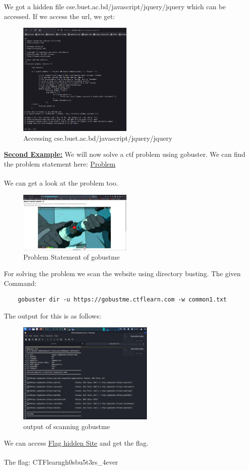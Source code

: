 \documentclass[12 pt]{article}
\begin{document}
We got a hidden file cse.buet.ac.bd/javascript/jquery/jquery which can be accessed. If we access the url, we get:
\begin{figure}[H]
    \centering
    \includegraphics[width=0.5\textwidth]{dir_4.png}
    \caption{Accessing cse.buet.ac.bd/javascript/jquery/jquery}
    \label{fig: dir4 Output}
\end{figure}
\textbf{\underline{Second Example:}}
We will now solve a ctf problem using gobuster. We can find the problem statement here: \href{https://gobustme.ctflearn.com/}{Problem}\\ \\
We can get a look at the problem too.
\begin{figure}[H]
    \centering
    \includegraphics[width=0.5\textwidth]{dir_5.png}
    \caption{Problem Statement of gobustme}
    \label{fig: dir5 Output}
\end{figure}
For solving the problem we scan the website using directory busting.
The given Command:
\begin{lstlisting}
    gobuster dir -u https://gobustme.ctflearn.com -w common1.txt 
\end{lstlisting}
The output for this is as follows:
\begin{figure}[H]
    \centering
    \includegraphics[width=0.6\textwidth]{dir_6.png}
    \caption{output of scanning gobustme}
    \label{fig: dir6 Output}
\end{figure}
We can access \href{https://gobustme.ctflearn.com/hide/}{Flag hidden Site} and get the flag. \\ \\
The flag: CTFlearn{gh0sbu5t3rs_4ever}
\end{document}
